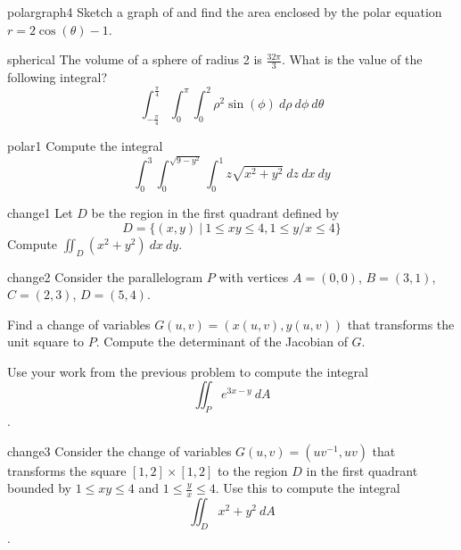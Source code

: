     \begin{problem}{polargraph4}
    Sketch a graph of and find the area enclosed by the polar equation $r = 2\cos(\theta) -1$.
    \end{problem}

    \begin{problem}{spherical}
        The volume of a sphere of radius 2 is $\frac{32\pi}{3}$.  What is the value of the following integral?$$\int_{-\frac{\pi}{4}}^{\frac{\pi}{4}}\int_0^\pi\int_0^2 \rho^2 \sin(\phi) \ d\rho \ d\phi \ d\theta$$
    \end{problem}

    \begin{problem}{polar1}
    Compute the integral $$\int_0^3\int_0^{\sqrt{9-y^2}}\int_0^1 z\sqrt{x^2 + y^2} \ dz \ dx \ dy$$
\end{problem}

\begin{problem}{change1}
    Let $D$ be the region in the first quadrant defined by $$D = \{ (x,y) \ | \ 1 \leq xy \leq 4, 1 \leq y/x \leq 4 \}$$
    Compute $\iint_D (x^2 + y^2) \ dx \ dy$.
\end{problem}

\begin{problem}{change2}
 Consider the parallelogram $P$ with vertices $A = (0,0)$, $B = (3,1)$, $C = (2,3)$, $D = (5,4)$.  
    \begin{subproblems}
    \item Find a change of variables $G(u,v) = (x(u,v), y(u,v))$ that transforms the unit square to $P$.  Compute the determinant of the Jacobian of $G$.
    \item Use your work from the previous problem to compute the integral $$\iint_P e^{3x-y} \ dA$$.
    \end{subproblems}
    
\end{problem}

\begin{problem}{change3}
    Consider the change of variables $G(u,v) = (uv^{-1}, uv)$ that transforms the square $[1,2]\times[1,2]$ to the region $D$ in the first quadrant bounded by $1 \leq xy \leq 4$ and $1 \leq \frac{y}{x} \leq 4$. Use this to compute the integral $$\iint_D x^2+y^2 \ dA$$.
\end{problem}